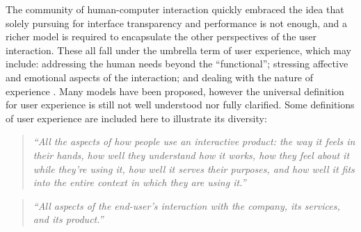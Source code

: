 \documentclass[a4paper,titlepage]{article}
\begin{document}
The community of human-computer interaction quickly embraced the idea
that solely pursuing for interface transparency and performance is not
enough, and a richer model is required to encapsulate the other
perspectives of the user interaction. These all fall under the
umbrella term of user experience, which may include: addressing the
human needs beyond the ``functional''; stressing affective and
emotional aspects of the interaction; and dealing with the nature of
experience \citep{ux:hassenzahl}. Many models have been proposed,
however the universal definition for user experience is still not well
understood nor fully clarified. Some definitions of user experience
are included here to illustrate its diversity:
\begin{quote}
  {\it ``All the aspects of how people use an interactive product: the
    way it feels in their hands, how well they understand how it
    works, how they feel about it while they're using it, how well it
    serves their purposes, and how well it fits into the entire
    context in which they are using it.''}

  \raggedleft \citet{experience:alben}
\end{quote}

\begin{quote}
  {\it ``All aspects of the end-user's interaction with the company,
    its services, and its product.''}

  \raggedleft \citet{experience:nielsen}
\end{quote}
\end{document}
